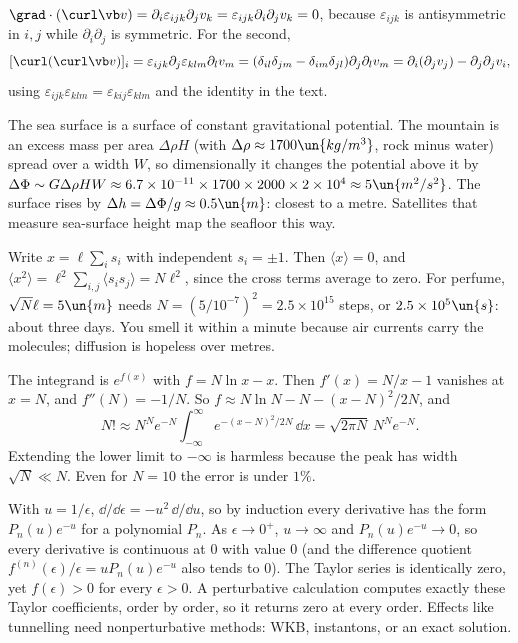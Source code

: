  $\grad\cdot(\curl\vb v) = \partial_i\varepsilon_{ijk}\partial_jv_k = \varepsilon_{ijk}\partial_i\partial_jv_k = 0$, because $\varepsilon_{ijk}$ is antisymmetric in $i,j$ while $\partial_i\partial_j$ is symmetric. For the second,
\[
  [\curl(\curl\vb v)]_i = \varepsilon_{ijk}\partial_j\varepsilon_{klm}\partial_lv_m = (\delta_{il}\delta_{jm}-\delta_{im}\delta_{jl})\partial_j\partial_lv_m = \partial_i(\partial_jv_j) - \partial_j\partial_jv_i ,
\]
using $\varepsilon_{ijk}\varepsilon_{klm} = \varepsilon_{kij}\varepsilon_{klm}$ and the identity in the text.

 The sea surface is a surface of constant gravitational potential. The mountain is an excess mass per area $\Delta\rho H$ (with $\Delta\rho\approx1700\un{kg/m^3}$, rock minus water) spread over a width $W$, so dimensionally it changes the potential above it by $\Delta\Phi\sim G\Delta\rho HW\approx6.7\times10^{-11}\times1700\times2000\times2\times10^4\approx5\un{m^2/s^2}$. The surface rises by $\Delta h = \Delta\Phi/g\approx0.5\un{m}$: closest to a metre. Satellites that measure sea-surface height map the seafloor this way.

 Write $x = \ell\sum_is_i$ with independent $s_i = \pm1$. Then $\langle x\rangle = 0$, and $\langle x^2\rangle = \ell^2\sum_{i,j}\langle s_is_j\rangle = N\ell^2$, since the cross terms average to zero. For perfume, $\sqrt N\ell = 5\un{m}$ needs $N = (5/10^{-7})^2 = 2.5\times10^{15}$ steps, or $2.5\times10^5\un{s}$: about three days. You smell it within a minute because air currents carry the molecules; diffusion is hopeless over metres.

 The integrand is $e^{f(x)}$ with $f = N\ln x - x$. Then $f'(x) = N/x - 1$ vanishes at $x = N$, and $f''(N) = -1/N$. So $f\approx N\ln N - N - (x-N)^2/2N$, and
\[
  N!\approx N^Ne^{-N}\int_{-\infty}^\infty e^{-(x-N)^2/2N}\,\dd x = \sqrt{2\pi N}\,N^Ne^{-N}.
\]
Extending the lower limit to $-\infty$ is harmless because the peak has width $\sqrt N\ll N$. Even for $N = 10$ the error is under $1\%$.

 With $u = 1/\epsilon$, $\dd/\dd\epsilon = -u^2\,\dd/\dd u$, so by induction every derivative has the form $P_n(u)e^{-u}$ for a polynomial $P_n$. As $\epsilon\to0^+$, $u\to\infty$ and $P_n(u)e^{-u}\to0$, so every derivative is continuous at $0$ with value $0$ (and the difference quotient $f^{(n)}(\epsilon)/\epsilon = uP_n(u)e^{-u}$ also tends to $0$). The Taylor series is identically zero, yet $f(\epsilon)>0$ for every $\epsilon>0$. A perturbative calculation computes exactly these Taylor coefficients, order by order, so it returns zero at every order. Effects like tunnelling need nonperturbative methods: WKB, instantons, or an exact solution.

